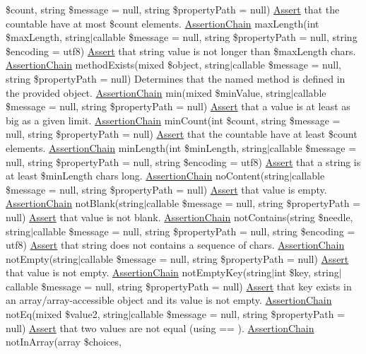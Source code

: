 \$count, string \$message = null, string \$property\+Path = null) \mbox{\hyperlink{class_assert_1_1_assert}{Assert}} that the countable have at most \$count elements.  \mbox{\hyperlink{class_assert_1_1_assertion_chain}{Assertion\+Chain}} max\+Length(int \$max\+Length, string$\vert$callable \$message = null, string \$property\+Path = null, string \$encoding = \textquotesingle{}utf8\textquotesingle{}) \mbox{\hyperlink{class_assert_1_1_assert}{Assert}} that string value is not longer than \$max\+Length chars.  \mbox{\hyperlink{class_assert_1_1_assertion_chain}{Assertion\+Chain}} method\+Exists(mixed \$object, string$\vert$callable \$message = null, string \$property\+Path = null) Determines that the named method is defined in the provided object.  \mbox{\hyperlink{class_assert_1_1_assertion_chain}{Assertion\+Chain}} min(mixed \$min\+Value, string$\vert$callable \$message = null, string \$property\+Path = null) \mbox{\hyperlink{class_assert_1_1_assert}{Assert}} that a value is at least as big as a given limit.  \mbox{\hyperlink{class_assert_1_1_assertion_chain}{Assertion\+Chain}} min\+Count(int \$count, string \$message = null, string \$property\+Path = null) \mbox{\hyperlink{class_assert_1_1_assert}{Assert}} that the countable have at least \$count elements.  \mbox{\hyperlink{class_assert_1_1_assertion_chain}{Assertion\+Chain}} min\+Length(int \$min\+Length, string$\vert$callable \$message = null, string \$property\+Path = null, string \$encoding = \textquotesingle{}utf8\textquotesingle{}) \mbox{\hyperlink{class_assert_1_1_assert}{Assert}} that a string is at least \$min\+Length chars long.  \mbox{\hyperlink{class_assert_1_1_assertion_chain}{Assertion\+Chain}} no\+Content(string$\vert$callable \$message = null, string \$property\+Path = null) \mbox{\hyperlink{class_assert_1_1_assert}{Assert}} that value is empty.  \mbox{\hyperlink{class_assert_1_1_assertion_chain}{Assertion\+Chain}} not\+Blank(string$\vert$callable \$message = null, string \$property\+Path = null) \mbox{\hyperlink{class_assert_1_1_assert}{Assert}} that value is not blank.  \mbox{\hyperlink{class_assert_1_1_assertion_chain}{Assertion\+Chain}} not\+Contains(string \$needle, string$\vert$callable \$message = null, string \$property\+Path = null, string \$encoding = \textquotesingle{}utf8\textquotesingle{}) \mbox{\hyperlink{class_assert_1_1_assert}{Assert}} that string does not contains a sequence of chars.  \mbox{\hyperlink{class_assert_1_1_assertion_chain}{Assertion\+Chain}} not\+Empty(string$\vert$callable \$message = null, string \$property\+Path = null) \mbox{\hyperlink{class_assert_1_1_assert}{Assert}} that value is not empty.  \mbox{\hyperlink{class_assert_1_1_assertion_chain}{Assertion\+Chain}} not\+Empty\+Key(string$\vert$int \$key, string$\vert$callable \$message = null, string \$property\+Path = null) \mbox{\hyperlink{class_assert_1_1_assert}{Assert}} that key exists in an array/array-\/accessible object and its value is not empty.  \mbox{\hyperlink{class_assert_1_1_assertion_chain}{Assertion\+Chain}} not\+Eq(mixed \$value2, string$\vert$callable \$message = null, string \$property\+Path = null) \mbox{\hyperlink{class_assert_1_1_assert}{Assert}} that two values are not equal (using == ).  \mbox{\hyperlink{class_assert_1_1_assertion_chain}{Assertion\+Chain}} not\+In\+Array(array \$choices, 